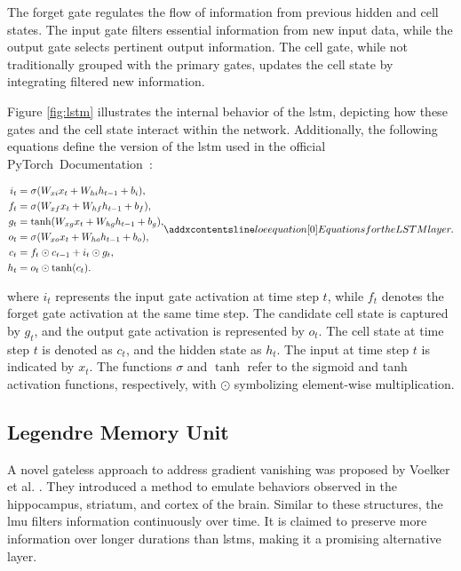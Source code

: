 The forget gate regulates the flow of information from previous hidden and cell states. The input gate filters essential information from new input data, while the output gate selects pertinent output information. The cell gate, while not traditionally grouped with the primary gates, updates the cell state by integrating filtered new information.

Figure \ref{fig:lstm} illustrates the internal behavior of the \gls{lstm}, depicting how these gates and the cell state interact within the network. Additionally, the following equations define the version of the \gls{lstm} used in the official PyTorch~Documentation~\cite{lstm-pytorch2}:

\begin{equation}
\begin{aligned}
    i_t &= \sigma(W_{xi} x_t + W_{hi} h_{t-1} + b_{i}), \\
    f_t &= \sigma(W_{xf} x_t + W_{hf} h_{t-1} + b_{f}), \\
    g_t &= \tanh(W_{xg} x_t + W_{hg} h_{t-1} + b_{g}), \\
    o_t &= \sigma(W_{xo} x_t + W_{ho} h_{t-1} + b_{o}), \\
    c_t &= f_t \odot c_{t-1} + i_t \odot g_t, \\
    h_t &= o_t \odot \tanh(c_t).
\end{aligned}
\setequationentry{Equations for the LSTM layer.}
\label{eq:lstm_equations}
\end{equation}


where \(i_t\) represents the input gate activation at time step \(t\), while \(f_t\) denotes the forget gate activation at the same time step. The candidate cell state is captured by \(g_t\), and the output gate activation is represented by \(o_t\). The cell state at time step \(t\) is denoted as \(c_t\), and the hidden state as \(h_t\). The input at time step \(t\) is indicated by \(x_t\). The functions \(\sigma\) and \(\tanh\) refer to the sigmoid and \gls{tanh} activation functions, respectively, with \(\odot\) symbolizing element-wise multiplication.

\subsection{Legendre Memory Unit}
\label{sect:lmu}

A novel gateless approach to address gradient vanishing was proposed by Voelker et al. \cite{lmu}. They introduced a method to emulate behaviors observed in the hippocampus, striatum, and cortex of the brain. Similar to these structures, the \gls{lmu} filters information continuously over time. It is claimed to preserve more information over longer durations than \glspl{lstm}, making it a promising alternative layer.

